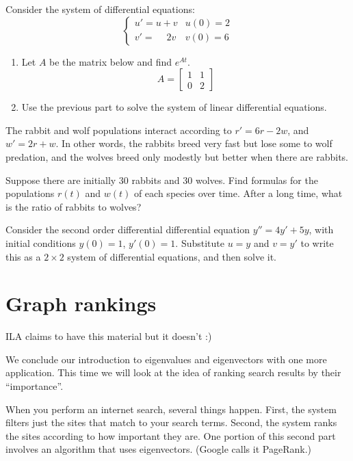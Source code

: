 \documentclass[11pt,oneside]{amsbook}
\theoremstyle{definition}
\theoremstyle{plain}
\theoremstyle{definition}
\theoremstyle{remark}
\numberwithin{equation}{section}
\numberwithin{figure}{section}
\newcounter{activityitem}
\newenvironment{activity}{\begin{list}{\arabic{activityitem}.}{\usecounter{activityitem}\setlength{\itemsep}{.2in}}}{\end{list}}
\begin{document}
\begin{activity}
  \item Consider the system of differential equations:
  \[\begin{cases}
      u'=u+v & u(0)=2\\
      v'=\quad\ 2v & v(0)=6
    \end{cases}
  \]
  \begin{enumerate}
    \item Let $A$ be the matrix below and find $e^{At}$.
    \[A=\begin{bmatrix}1&1\\0&2\end{bmatrix}
    \]
    \item Use the previous part to solve the system of linear differential equations.
  \end{enumerate}
  \item The rabbit and wolf populations interact according to $r'=6r-2w$, and $w'=2r+w$. In other words, the rabbits breed very fast but lose some to wolf predation, and the wolves breed only modestly but better when there are rabbits.

  Suppose there are initially 30 rabbits and 30 wolves. Find formulas for the populations $r(t)$ and $w(t)$ of each species over time. After a long time, what is the ratio of rabbits to wolves?
  \item Consider the second order differential differential equation $y''=4y'+5y$, with initial conditions $y(0)=1$, $y'(0)=1$. Substitute $u=y$ and $v=y'$ to write this as a $2\times2$ system of differential equations, and then solve it.
\end{activity}


\newpage
\section{Graph rankings}

ILA claims to have this material but it doesn't :)

We conclude our introduction to eigenvalues and eigenvectors with one more application. This time we will look at the idea of ranking search results by their ``importance''.

When you perform an internet search, several things happen. First, the system filters just the sites that match to your search terms. Second, the system ranks the sites according to how important they are. One portion of this second part involves an algorithm that uses eigenvectors. (Google calls it PageRank.)
\end{document}
